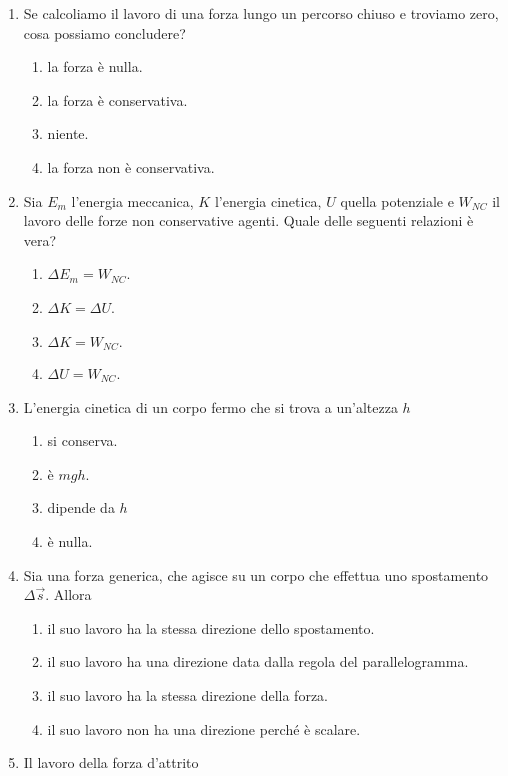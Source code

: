 \documentclass{article}
\begin{document}
\begin{enumerate}
\begin{enumerate}[label=\Alph*.]
  \end{enumerate}
  \item Se calcoliamo il lavoro di una forza lungo un percorso chiuso e troviamo zero, cosa possiamo concludere?
  \begin{enumerate}[label=\Alph*.]
    \item la forza è nulla.
    \item la forza è conservativa.
    \item niente.
    \item la forza non è conservativa.
  \end{enumerate}
  \item Sia $E_m$ l'energia meccanica, $K$ l'energia cinetica, $U$ quella potenziale e $W_{NC}$ il lavoro delle forze non conservative agenti. Quale delle seguenti relazioni è vera?
  \begin{enumerate}[label=\Alph*.]
    \item $\Delta E_m=W_{NC}$.
    \item $\Delta K = \Delta U$.
    \item $\Delta K=W_{NC}.$
    \item $\Delta U=W_{NC}$.
  \end{enumerate}
  \item L'energia cinetica di un corpo fermo che si trova a un'altezza $h$
  \begin{enumerate}[label=\Alph*.]
    \item si conserva.
    \item è $mgh$.
    \item dipende da $h$
    \item è nulla.
  \end{enumerate}
  \item Sia  una forza generica, che agisce su un corpo che effettua uno spostamento $\Delta \vec{s}$. Allora
  \begin{enumerate}[label=\Alph*.]
    \item il suo lavoro ha la stessa direzione dello spostamento.
    \item il suo lavoro ha una direzione data dalla regola del parallelogramma.
    \item il suo lavoro ha la stessa direzione della forza.
    \item il suo lavoro non ha una direzione perché è scalare.
  \end{enumerate}
  \item Il lavoro della forza d'attrito
  \begin{enumerate}[label=\Alph*.]

\end{enumerate}
\end{enumerate}
\end{document}

